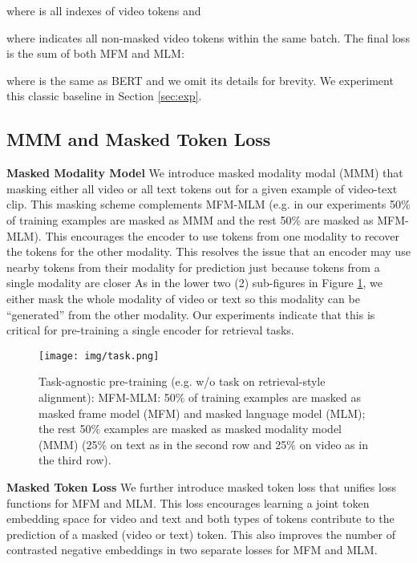 \documentclass[11pt,a4paper]{article}
\begin{document}
where  is all indexes of video tokens and

where  indicates all non-masked video tokens within the same batch.
The final loss is the sum of both MFM and MLM:

where  is the same as BERT and we omit its details for brevity.
We experiment this classic baseline in Section \ref{sec:exp}.








\subsection{MMM and Masked Token Loss}
\label{sec:mmmmtl}
\noindent \textbf{Masked Modality Model} We introduce masked modality modal (MMM) that masking either all video or all text tokens out for a given example of video-text clip. 
This masking scheme complements MFM-MLM (e.g. in our experiments 50\% of training examples are masked as MMM and the rest 50\% are masked as MFM-MLM).
This encourages the encoder to use tokens from one modality to recover the tokens for the other modality.
This resolves the issue that an encoder may use nearby tokens from their modality for prediction just because tokens from a single modality are closer
As in the lower two (2) sub-figures in Figure \ref{fig:task}, we either mask the whole modality of video or text so this modality can be ``generated'' from the other modality. 
Our experiments indicate that this is critical for pre-training a single encoder 
for retrieval tasks. 

\begin{figure}[t]
\centering
\texttt{[image: img/task.png]}
    \caption{Task-agnostic pre-training (e.g. w/o task on retrieval-style alignment): MFM-MLM: 50\% of training examples are masked as masked frame model (MFM) and masked language model (MLM); the rest 50\% examples are masked as masked modality model (MMM) (25\% on text as in the second row and 25\% on video as in the third row).}
\vspace{-3mm}
\label{fig:task}
\end{figure}

\noindent \textbf{Masked Token Loss} We further introduce masked token loss that unifies loss functions for MFM and MLM.
This loss encourages learning a joint token embedding space for video and text and both types of tokens contribute to the prediction of a masked (video or text) token.
This also improves the number of contrasted negative embeddings in two separate losses for MFM and MLM.
\end{document}
